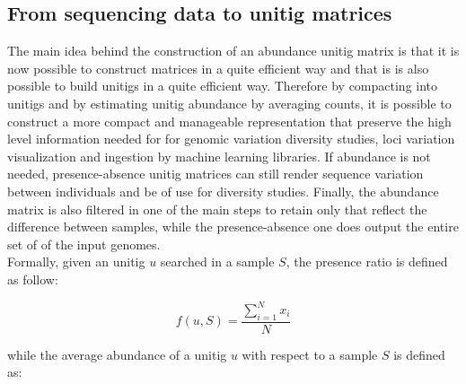 \subsection{From sequencing data to unitig matrices}
The main idea behind the construction of an abundance unitig matrix is that it is now possible to construct \kmer matrices in a quite efficient way and that is is also possible to build unitigs in a quite efficient way. Therefore by compacting \kmers into unitigs and by estimating unitig abundance by averaging \kmer counts, it is possible to construct a more compact and manageable representation that preserve the high level information needed for for genomic variation diversity studies, loci variation visualization and ingestion by machine learning libraries. If abundance is not needed, presence-absence unitig matrices can still render sequence variation between individuals and be of use for diversity studies. Finally, the abundance matrix is also filtered in one of the main steps to retain only \kmers that reflect the difference between samples, while the presence-absence one does output the entire set of \kmers of the input genomes.\\
Formally, given an unitig $u$ searched in a sample $S$, the \kmer presence ratio is defined as follow:

\begin{equation}
	f(u, S) = \frac{\sum_{i=1}^{N}{x_i}}{N}
\end{equation}

while the average abundance of a unitig $u$ with respect to a sample $S$ is defined as:

